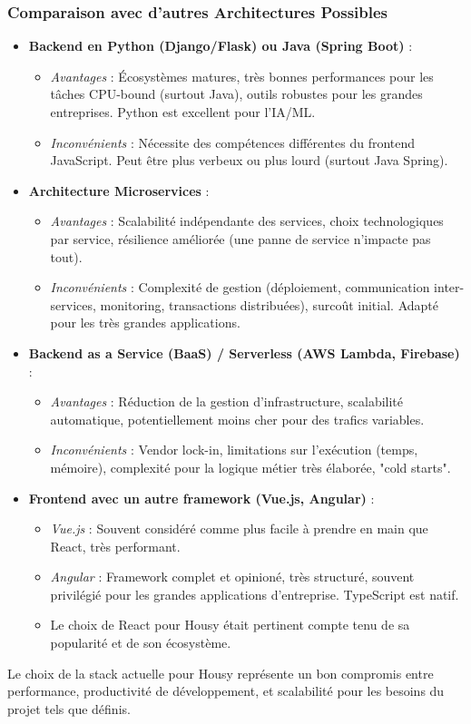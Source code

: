 \documentclass[11pt,a4paper]{report}
\begin{document}
\subsubsection{Comparaison avec d'autres Architectures Possibles}
\begin{itemize}
    \item \textbf{Backend en Python (Django/Flask) ou Java (Spring Boot)} :
        \begin{itemize}
            \item \textit{Avantages} : Écosystèmes matures, très bonnes performances pour les tâches CPU-bound (surtout Java), outils robustes pour les grandes entreprises. Python est excellent pour l'IA/ML.
            \item \textit{Inconvénients} : Nécessite des compétences différentes du frontend JavaScript. Peut être plus verbeux ou plus lourd (surtout Java Spring).
        \end{itemize}
    \item \textbf{Architecture Microservices} :
        \begin{itemize}
            \item \textit{Avantages} : Scalabilité indépendante des services, choix technologiques par service, résilience améliorée (une panne de service n'impacte pas tout).
            \item \textit{Inconvénients} : Complexité de gestion (déploiement, communication inter-services, monitoring, transactions distribuées), surcoût initial. Adapté pour les très grandes applications.
        \end{itemize}
    \item \textbf{Backend as a Service (BaaS) / Serverless (AWS Lambda, Firebase)} :
        \begin{itemize}
            \item \textit{Avantages} : Réduction de la gestion d'infrastructure, scalabilité automatique, potentiellement moins cher pour des trafics variables.
            \item \textit{Inconvénients} : Vendor lock-in, limitations sur l'exécution (temps, mémoire), complexité pour la logique métier très élaborée, "cold starts".
        \end{itemize}
    \item \textbf{Frontend avec un autre framework (Vue.js, Angular)} :
        \begin{itemize}
            \item \textit{Vue.js} : Souvent considéré comme plus facile à prendre en main que React, très performant.
            \item \textit{Angular} : Framework complet et opinioné, très structuré, souvent privilégié pour les grandes applications d'entreprise. TypeScript est natif.
            \item Le choix de React pour Housy était pertinent compte tenu de sa popularité et de son écosystème.
        \end{itemize}
\end{itemize}
Le choix de la stack actuelle pour Housy représente un bon compromis entre performance, productivité de développement, et scalabilité pour les besoins du projet tels que définis.
\end{document}
